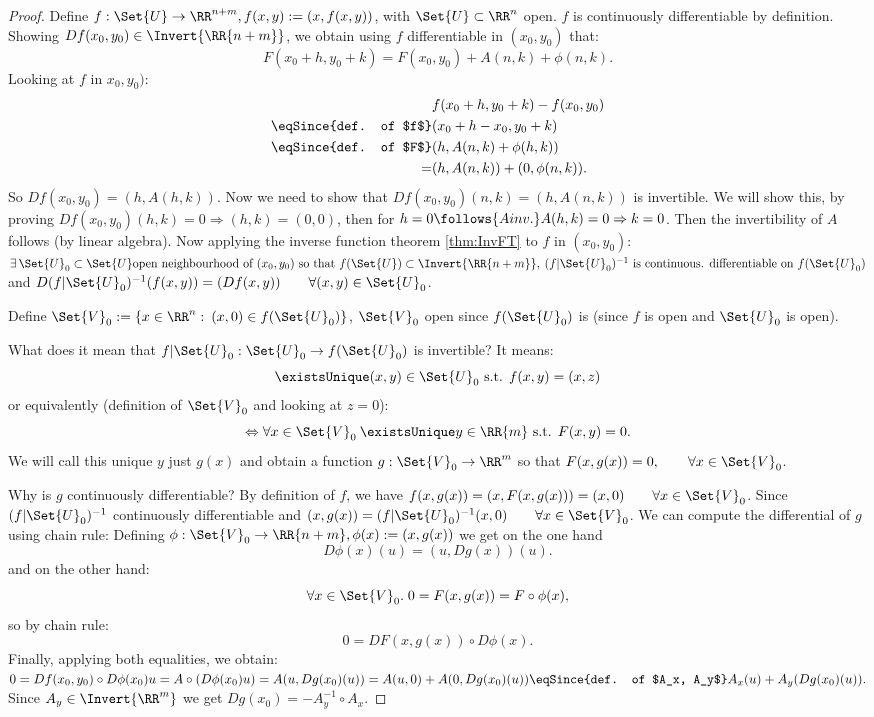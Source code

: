 \begin{proof}
  Define $f:\Set{U}\to \RR^{n+m}, f(x,y):=(x,f(x,y))$, with $\Set{U}\subset \RR^{n}$ open. $f$ is continuously differentiable by definition. Showing $Df(x_0, y_0)\in\Invert{\RR{n+m}}$, we obtain using $f$ differentiable in $(x_0, y_0)$ that: $$F(x_0+h,y_0+k)=F(x_0, y_0)+A(n,k)+\phi(n,k).$$
  Looking at $f$ in $x_0, y_0)$: \begin{align*}
  	&f(x_0+h, y_0+k)-f(x_0,y_0)\\\eqSince{def. of $f$}&(x_0+h-x_0, y_0+k)\\\eqSince{def. of $F$}&(h,A(n,k)+\phi(h,k))\\=&(h,A(n,k))+(0,\phi(n,k)).
  \end{align*}
  So $Df(x_0, y_0)=(h,A(h,k))$. Now we need to show that $Df(x_0, y_0)(n,k)=(h,A(n,k))$ is invertible. We will show this, by proving $Df(x_0, y_0)(h,k)=0\Rightarrow(h,k)=(0,0)$, then for $h=0\follows{A inv.}A(h,k)=0\Rightarrow k=0$. Then the invertibility of $A$ follows (by linear algebra). Now applying the inverse function theorem \ref{thm:InvFT} to $f$ in $(x_0, y_0)$: 
  $\exists\, \Set{U}_0\subset\Set{U}\text{open neighbourhood of }(x_0, y_0)\text{ so that }f(\Set{U})\subset\Invert{\RR{n+m}},\:(f|\Set{U}_0)^{-1}\text{ is continuous. differentiable on $f(\Set{U}_0)$}$ and $D(f|\Set{U}_0)^{-1}(f(x,y)) \\=(Df(x,y))\qquad\forall(x,y)\in\Set{U}_0$. 
  
  Define $\Set{V}_0:=\{x\in\RR^n:\:(x,0)\in f(\Set{U}_0)\}$, $\Set{V}_0$ open since $f(\Set{U}_0)$ is (since $f$ is open and $\Set{U}_0$ is open). 
  
  What does it mean that $f|\Set{U}_0:\Set{U}_0\to f(\Set{U}_0)$ is invertible?
  It means: $$\existsUnique(x,y)\in\Set{U}_0\text{ s.t. }f(x,y)=(x,z)$$ or equivalently (definition of $\Set{V}_0$ and looking at $z=0$): $$\Leftrightarrow \forall x\in\Set{V}_0\:\existsUnique y\in\RR{m}\text{ s.t. }F(x,y)=0.$$
  We will call this unique $y$ just $g(x)$ and obtain a function $g:\Set{V}_0\to\RR^m$ so that $F(x,g(x))=0,\qquad\forall x\in\Set{V}_0$. 
  
  Why is $g$ continuously differentiable?
  By definition of $f$, we have $f(x,g(x))=(x,F(x,g(x)))=(x,0)\qquad\forall x\in\Set{V}_0$. Since $(f|\Set{U}_0)^{-1}$ continuously differentiable and $(x,g(x))=(f|\Set{U}_0)^{-1}(x,0)\qquad\forall x\in\Set{V}_0$. We can compute the differential of $g$ using chain rule: 
  Defining $\phi:\Set{V}_0\to\RR{n+m}, \phi(x):=(x,g(x))$ we get on the one hand $$D\phi(x)(u)=(u,Dg(x))(u).$$ and on the other hand: $$\forall x\in\Set{V}_0.\;0=F(x,g(x))=F\circ\phi(x),$$ so by chain rule: $$0=DF(x,g(x))\circ D\phi(x).$$
  Finally, applying both equalities, we obtain: 
  $0=Df(x_0,y_0)\circ D\phi(x_0)u=A\circ (D\phi(x_0)u)=A(u,Dg(x_0)(u))=A(u,0)+A(0,Dg(x_0)(u))\eqSince{def. of $A_x, A_y$}A_x(u)+A_y(Dg(x_0)(u)).$ \\Since $A_y\in\Invert{\RR^m}$ we get $Dg(x_0)=-A_y^{-1}\circ A_x$.
\end{proof}